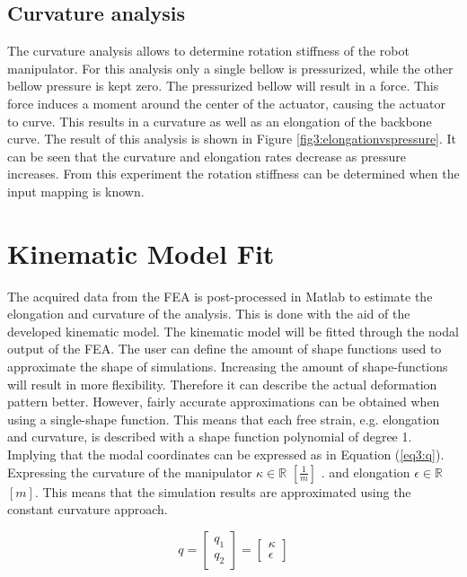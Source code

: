 \subsection{Curvature analysis}

The curvature analysis allows to determine rotation stiffness of the robot manipulator. For this analysis only a single bellow is pressurized, while the other bellow pressure is kept zero. The pressurized bellow will result in a force. This force induces a moment around the center of the actuator, causing the actuator to curve. This results in a curvature as well as an elongation of the backbone curve. The result of this analysis is shown in Figure \ref{fig3:elongationvspressure}. It can be seen that the curvature and elongation rates decrease as pressure increases. From this experiment the rotation stiffness can be determined when the input mapping is known.  


\section{Kinematic Model Fit}
\label{sec3:KinematicModelFit}

The acquired data from the FEA is post-processed in Matlab to estimate the elongation and curvature of the analysis. This is done with the aid of the developed kinematic model. The kinematic model will be fitted through the nodal output of the FEA. The user can define the amount of shape functions used to approximate the shape of simulations. Increasing the amount of shape-functions will result in more flexibility. Therefore it can describe the actual deformation pattern better. However, fairly accurate approximations can be obtained when using a single-shape function. This means that each free strain, e.g. elongation and curvature, is described with a shape function polynomial of degree 1. Implying that the modal coordinates can be expressed as in Equation (\ref{eq3:q}). Expressing the curvature of the manipulator
 $\kappa \in \mathbb{R}$ $[\frac{1}{m}]$ . and elongation $\epsilon \in \mathbb{R}$ $[m]$.  This means that the simulation results are approximated using the constant curvature approach.

\begin{equation}
    q =  \begin{bmatrix} q_1 \\ q_2 \end{bmatrix}     = \begin{bmatrix} \kappa \\ \epsilon \end{bmatrix} 
    \label{eq3:q}
\end{equation}


